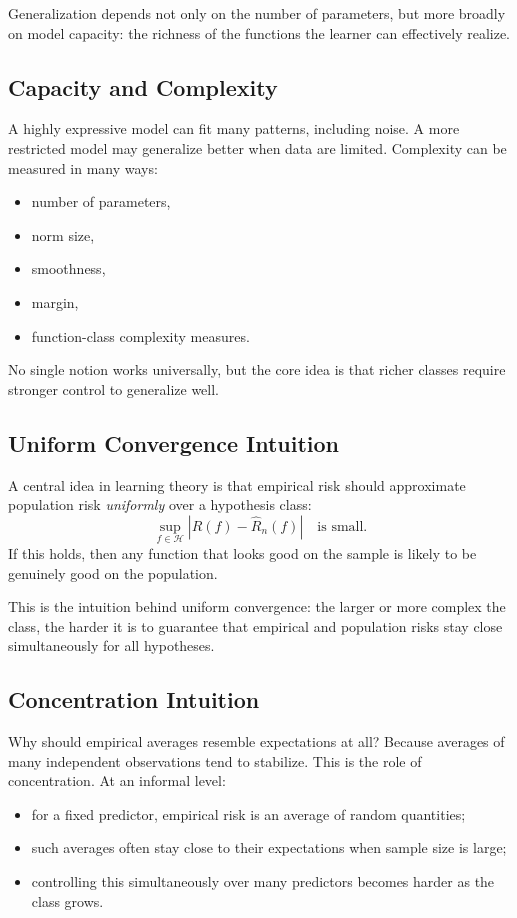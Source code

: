 Generalization depends not only on the number of parameters, but more broadly on model capacity: the richness of the functions the learner can effectively realize.

\subsection{Capacity and Complexity}

A highly expressive model can fit many patterns, including noise. A more restricted model may generalize better when data are limited. Complexity can be measured in many ways:
\begin{itemize}
    \item number of parameters,
    \item norm size,
    \item smoothness,
    \item margin,
    \item function-class complexity measures.
\end{itemize}

No single notion works universally, but the core idea is that richer classes require stronger control to generalize well.

\subsection{Uniform Convergence Intuition}

A central idea in learning theory is that empirical risk should approximate population risk \emph{uniformly} over a hypothesis class:
\[
\sup_{f\in\mathcal{H}} |R(f)-\widehat{R}_n(f)|
\quad \text{is small.}
\]
If this holds, then any function that looks good on the sample is likely to be genuinely good on the population.

This is the intuition behind uniform convergence: the larger or more complex the class, the harder it is to guarantee that empirical and population risks stay close simultaneously for all hypotheses.

\subsection{Concentration Intuition}

Why should empirical averages resemble expectations at all? Because averages of many independent observations tend to stabilize. This is the role of concentration. At an informal level:
\begin{itemize}
    \item for a fixed predictor, empirical risk is an average of random quantities;
    \item such averages often stay close to their expectations when sample size is large;
    \item controlling this simultaneously over many predictors becomes harder as the class grows.
\end{itemize}

